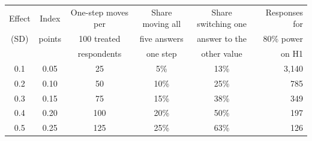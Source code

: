\begin{tabular}{c c c c c r}
\toprule
Effect & Index & One-step moves per & Share moving all & Share switching one & Responses for \\
(SD) & points & 100 treated & five answers & answer to the & 80\% power \\
 & & respondents & one step & other value & on H1 \\
\midrule
0.1 & 0.05 & 25 & 5\% & 13\% & 3,140 \\
0.2 & 0.10 & 50 & 10\% & 25\% & 785 \\
0.3 & 0.15 & 75 & 15\% & 38\% & 349 \\
0.4 & 0.20 & 100 & 20\% & 50\% & 197 \\
0.5 & 0.25 & 125 & 25\% & 63\% & 126 \\
\bottomrule
\end{tabular}
